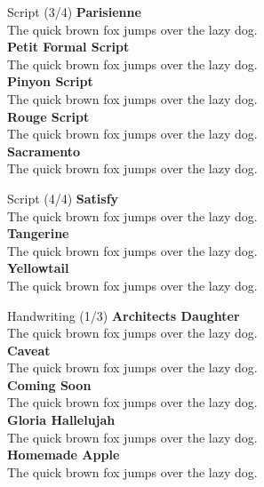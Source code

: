 \documentclass[10pt]{beamer}
\begin{document}
\begin{frame}{Script (3/4)}
\vspace{-0.2cm}
  {\ParisienneLocal\Large\bfseries Parisienne\\}
  {\ParisienneLocal The quick brown fox jumps over the lazy dog.\\[0.3cm]}
  {\PetitFormalScriptLocal\Large\bfseries Petit Formal Script\\}
  {\PetitFormalScriptLocal The quick brown fox jumps over the lazy dog.\\[0.3cm]}
  {\PinyonScriptLocal\Large\bfseries Pinyon Script\\}
  {\PinyonScriptLocal The quick brown fox jumps over the lazy dog.\\[0.3cm]}
  {\RougeScriptLocal\Large\bfseries Rouge Script\\}
  {\RougeScriptLocal The quick brown fox jumps over the lazy dog.\\[0.3cm]}
  {\SacramentoLocal\Large\bfseries Sacramento\\}
  {\SacramentoLocal The quick brown fox jumps over the lazy dog.\\[0.3cm]}
\end{frame}

\begin{frame}{Script (4/4)}
\vspace{-0.2cm}
  {\SatisfyLocal\Large\bfseries Satisfy\\}
  {\SatisfyLocal The quick brown fox jumps over the lazy dog.\\[0.3cm]}
  {\TangerineLocal\Large\bfseries Tangerine\\}
  {\TangerineLocal The quick brown fox jumps over the lazy dog.\\[0.3cm]}
  {\YellowtailLocal\Large\bfseries Yellowtail\\}
  {\YellowtailLocal The quick brown fox jumps over the lazy dog.\\[0.3cm]}
\end{frame}

\begin{frame}{Handwriting (1/3)}
\vspace{-0.2cm}
  {\ArchitectsDaughterLocal\Large\bfseries Architects Daughter\\}
  {\ArchitectsDaughterLocal The quick brown fox jumps over the lazy dog.\\[0.3cm]}
  {\CaveatLocal\Large\bfseries Caveat\\}
  {\CaveatLocal The quick brown fox jumps over the lazy dog.\\[0.3cm]}
  {\ComingSoonLocal\Large\bfseries Coming Soon\\}
  {\ComingSoonLocal The quick brown fox jumps over the lazy dog.\\[0.3cm]}
  {\GloriaHallelujahLocal\Large\bfseries Gloria Hallelujah\\}
  {\GloriaHallelujahLocal The quick brown fox jumps over the lazy dog.\\[0.3cm]}
  {\HomemadeAppleLocal\Large\bfseries Homemade Apple\\}
  {\HomemadeAppleLocal The quick brown fox jumps over the lazy dog.\\[0.3cm]}
\end{frame}
\end{document}
